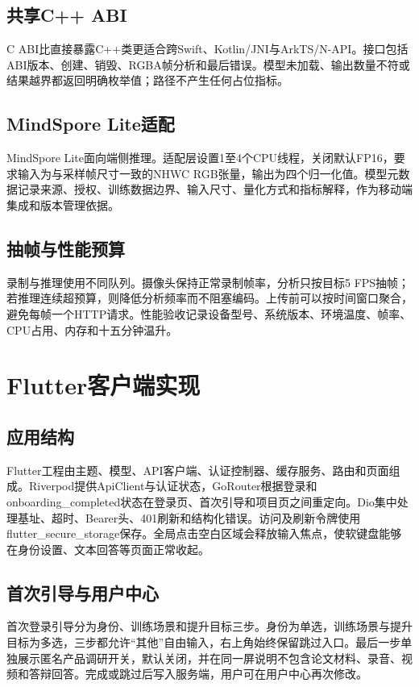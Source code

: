 \section{共享C++ ABI}
C ABI比直接暴露C++类更适合跨Swift、Kotlin/JNI与ArkTS/N-API。接口包括ABI版本、创建、销毁、RGBA帧分析和最后错误。模型未加载、输出数量不符或结果越界都返回明确枚举值；路径不产生任何占位指标。

\section{MindSpore Lite适配}
MindSpore Lite面向端侧推理\cite{mindsporelite}。适配层设置1至4个CPU线程，关闭默认FP16，要求输入为与采样帧尺寸一致的NHWC RGB张量，输出为四个归一化值。模型元数据记录来源、授权、训练数据边界、输入尺寸、量化方式和指标解释，作为移动端集成和版本管理依据。

\section{抽帧与性能预算}
录制与推理使用不同队列。摄像头保持正常录制帧率，分析只按目标5 FPS抽帧；若推理连续超预算，则降低分析频率而不阻塞编码。上传前可以按时间窗口聚合，避免每帧一个HTTP请求。性能验收记录设备型号、系统版本、环境温度、帧率、CPU占用、内存和十五分钟温升。

\chapter{Flutter客户端实现}
\section{应用结构}
Flutter工程由主题、模型、API客户端、认证控制器、缓存服务、路由和页面组成。Riverpod提供ApiClient与认证状态，GoRouter根据登录和onboarding\_completed状态在登录页、首次引导和项目页之间重定向。Dio集中处理基址、超时、Bearer头、401刷新和结构化错误。访问及刷新令牌使用flutter\_secure\_storage保存。全局点击空白区域会释放输入焦点，使软键盘能够在身份设置、文本回答等页面正常收起。

\section{首次引导与用户中心}
首次登录引导分为身份、训练场景和提升目标三步。身份为单选，训练场景与提升目标为多选，三步都允许“其他”自由输入，右上角始终保留跳过入口。最后一步单独展示匿名产品调研开关，默认关闭，并在同一屏说明不包含论文材料、录音、视频和答辩回答。完成或跳过后写入服务端，用户可在用户中心再次修改。

